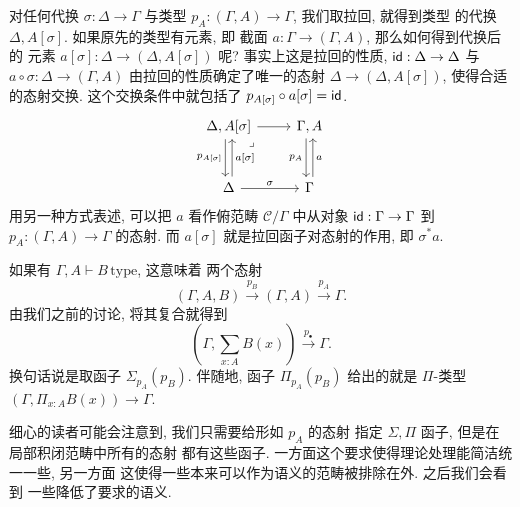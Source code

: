 对任何代换 \(\sigma : \Delta \to \Gamma\) 与类型
\(p_A : (\Gamma, A) \to \Gamma\), 我们取拉回, 就得到类型
的代换 \(\Delta, A[\sigma]\). 如果原先的类型有元素, 即
截面 \(a : \Gamma \to (\Gamma, A)\), 那么如何得到代换后的
元素 \(a[\sigma] : \Delta \to (\Delta, A[\sigma])\) 呢?
事实上这是拉回的性质, \(\textnormal{\textsf{id}} : \Delta \to \Delta\)
与 \(a \circ \sigma : \Delta \to (\Gamma, A)\)
由拉回的性质确定了唯一的态射 \(\Delta \to (\Delta, A[\sigma])\),
使得合适的态射交换. 这个交换条件中就包括了
\(p_{A[\sigma]} \circ a[\sigma] = \textnormal{\textsf{id}}\).
\[\begin{tikzcd}[row sep=large]
  {\Delta, A[\sigma]} & {\Gamma,A} \\
  \Delta & \Gamma
  \arrow["{p_A}"', shift right=1, from=1-2, to=2-2]
  \arrow["a"', shift right=1, from=2-2, to=1-2]
  \arrow["\sigma", from=2-1, to=2-2]
  \arrow[from=1-1, to=1-2]
  \arrow["{p_{A[\sigma]}}"', shift right=1, from=1-1, to=2-1]
  \arrow["\lrcorner"{anchor=center, pos=0.125}, draw=none, from=1-1, to=2-2]
  \arrow["{a[\sigma]}"', shift right=1, from=2-1, to=1-1]
\end{tikzcd}\]
用另一种方式表述, 可以把 \(a\) 看作俯范畴 \(\mathcal C/\Gamma\)
中从对象 \(\textnormal{\textsf{id}} : \Gamma \to \Gamma\) 到
\(p_A : (\Gamma,A) \to \Gamma\) 的态射. 而
\(a[\sigma]\) 就是拉回函子对态射的作用, 即 \(\sigma^* a\).

如果有 \(\Gamma, A \vdash B\,\text{type}\), 这意味着
两个态射
\[(\Gamma, A, B) \xrightarrow{p_B} (\Gamma, A) \xrightarrow{p_A} \Gamma.\]
由我们之前的讨论, 将其复合就得到
\[\left(\Gamma, \sum_{x:A} B(x)\right) \xrightarrow{p_{\bullet}} \Gamma.\]
换句话说是取函子 \(\Sigma_{p_A}(p_B)\). 伴随地, 函子
\(\Pi_{p_A}(p_B)\) 给出的就是 \(\Pi\)-类型
\((\Gamma, \Pi_{x:A} B(x)) \to \Gamma\).

细心的读者可能会注意到, 我们只需要给形如 \(p_A\) 的态射
指定 \(\Sigma,\Pi\) 函子, 但是在局部积闭范畴中所有的态射
都有这些函子. 一方面这个要求使得理论处理能简洁统一一些, 另一方面
这使得一些本来可以作为语义的范畴被排除在外. 之后我们会看到
一些降低了要求的语义.

